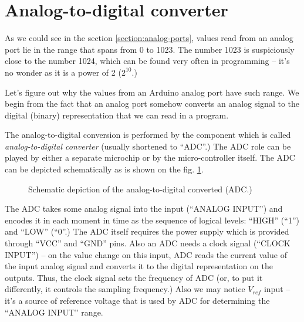 \documentclass[../sparc.tex]{subfiles}
\begin{document}
\section{Analog-to-digital converter}

As we could see in the section \ref{section:analog-ports}, values read from an
analog port lie in the range that spans from 0 to 1023.  The number 1023 is
suspiciously close to the number 1024, which can be found very often in
programming -- it's no wonder as it is a power of 2 ($2^{10}$.)

Let's figure out why the values from an Arduino analog port have such range.  We
begin from the fact that an analog port somehow converts an analog signal to the
digital (binary) representation that we can read in a program.

The analog-to-digital conversion is performed by the component which is called
\emph{analog-to-digital converter} (usually shortened to ``ADC''.)  The ADC role
can be played by either a separate microchip or by the micro-controller itself.
The ADC can be depicted schematically as is shown on the
fig. \ref{fig:adc-schematics}.

\begin{figure}[ht]
  \centering
  \caption{Schematic depiction of the analog-to-digital converted (ADC.)}
  \label{fig:adc-schematics}
\end{figure}

The ADC takes some analog signal into the input (``ANALOG INPUT'') and encodes
it in each moment in time as the sequence of logical levels: ``HIGH'' (``1'')
and ``LOW'' (``0''.)  The ADC itself requires the power supply which is provided
through ``VCC'' and ``GND'' pins.  Also an ADC needs a clock signal (``CLOCK
INPUT'') -- on the value change on this input, ADC reads the current value of the
input analog signal and converts it to the digital representation on the
outputs.  Thus, the clock signal sets the frequency of ADC (or, to put it
differently, it controls the sampling frequency.)  Also we may notice $V_{ref}$
input -- it's a source of reference voltage that is used by ADC for determining
the ``ANALOG INPUT'' range.
\end{document}
